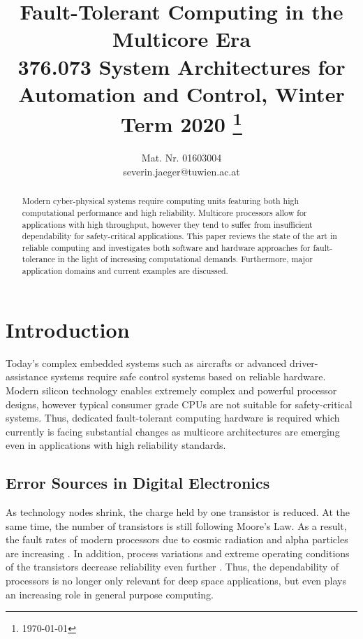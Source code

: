 \documentclass[conference]{IEEEtran}
\begin{document}
\title{Fault-Tolerant Computing in the Multicore Era\\
{\normalsize 376.073 System Architectures for Automation and Control, Winter Term 2020}
\thanks{\today}
}

\author{
Mat. Nr. 01603004\\
severin.jaeger@tuwien.ac.at}


\maketitle

\begin{abstract}
Modern cyber-physical systems require computing units featuring both high computational performance and high reliability. Multicore processors allow for applications with high throughput, however they tend to suffer from insufficient dependability for safety-critical applications. This paper reviews the state of the art in reliable computing and investigates both software and hardware approaches for fault-tolerance in the light of increasing computational demands. Furthermore, major application domains and current examples are discussed.
\end{abstract}

\section{Introduction}
Today's complex embedded systems such as aircrafts or advanced driver-assistance systems require safe control systems based on reliable hardware. Modern silicon technology enables extremely complex and powerful processor designs, however typical consumer grade CPUs are not suitable for safety-critical systems. Thus, dedicated fault-tolerant computing hardware is required which currently is facing substantial changes as multicore architectures are emerging even in applications with high reliability standards.


\subsection{Error Sources in Digital Electronics}
As technology nodes shrink, the charge held by one transistor is reduced. At the same time, the number of transistors is still following Moore's Law. As a result, the fault rates of modern processors due to cosmic radiation and alpha particles are increasing \cite{Sorin2009}. In addition, process variations and extreme operating conditions of the transistors decrease reliability even further \cite{Gizopoulos2011}. Thus, the dependability of processors is no longer only relevant for deep space applications, but even plays an increasing role in general purpose computing.
\end{document}
